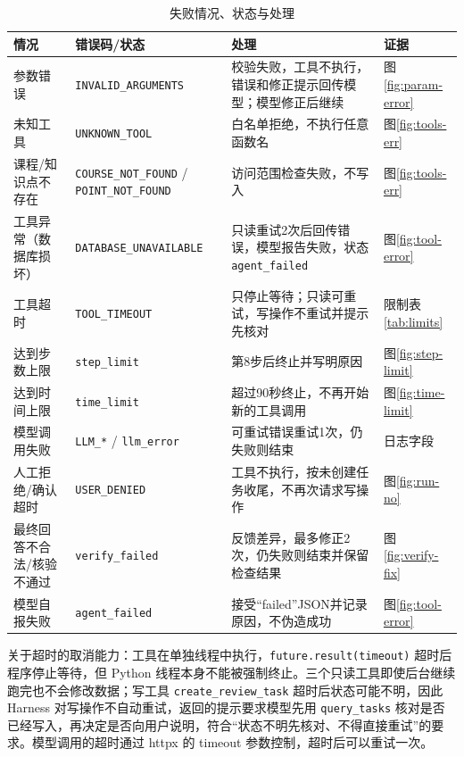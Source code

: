 \documentclass[UTF8,12pt,a4paper]{ctexart}
\begin{document}
\begin{table}[H]
\centering
\caption{失败情况、状态与处理}
\label{tab:failures}
\scriptsize
\begin{tabularx}{\textwidth}{p{2.6cm}p{3.5cm}X p{3.2cm}}
\toprule
情况 & 错误码/状态 & 处理 & 证据 \\
\midrule
参数错误 & \texttt{INVALID\_ARGUMENTS} & 校验失败，工具不执行，错误和修正提示回传模型；模型修正后继续 & 图\ref{fig:param-error} \\
未知工具 & \texttt{UNKNOWN\_TOOL} & 白名单拒绝，不执行任意函数名 & 图\ref{fig:tools-err} \\
课程/知识点不存在 & \texttt{COURSE\_NOT\_FOUND} / \texttt{POINT\_NOT\_FOUND} & 访问范围检查失败，不写入 & 图\ref{fig:tools-err} \\
工具异常（数据库损坏） & \texttt{DATABASE\_UNAVAILABLE} & 只读重试2次后回传错误，模型报告失败，状态 \texttt{agent\_failed} & 图\ref{fig:tool-error} \\
工具超时 & \texttt{TOOL\_TIMEOUT} & 只停止等待；只读可重试，写操作不重试并提示先核对 & 限制表\ref{tab:limits} \\
达到步数上限 & \texttt{step\_limit} & 第8步后终止并写明原因 & 图\ref{fig:step-limit} \\
达到时间上限 & \texttt{time\_limit} & 超过90秒终止，不再开始新的工具调用 & 图\ref{fig:time-limit} \\
模型调用失败 & \texttt{LLM\_*} / \texttt{llm\_error} & 可重试错误重试1次，仍失败则结束 & 日志字段 \\
人工拒绝/确认超时 & \texttt{USER\_DENIED} & 工具不执行，按未创建任务收尾，不再次请求写操作 & 图\ref{fig:run-no} \\
最终回答不合法/核验不通过 & \texttt{verify\_failed} & 反馈差异，最多修正2次，仍失败则结束并保留检查结果 & 图\ref{fig:verify-fix} \\
模型自报失败 & \texttt{agent\_failed} & 接受“failed”JSON并记录原因，不伪造成功 & 图\ref{fig:tool-error} \\
\bottomrule
\end{tabularx}
\end{table}

关于超时的取消能力：工具在单独线程中执行，\texttt{future.result(timeout)} 超时后程序停止等待，但 Python 线程本身不能被强制终止。三个只读工具即使后台继续跑完也不会修改数据；写工具 \texttt{create\_review\_task} 超时后状态可能不明，因此 Harness 对写操作不自动重试，返回的提示要求模型先用 \texttt{query\_tasks} 核对是否已经写入，再决定是否向用户说明，符合“状态不明先核对、不得直接重试”的要求。模型调用的超时通过 httpx 的 timeout 参数控制，超时后可以重试一次。
\end{document}
